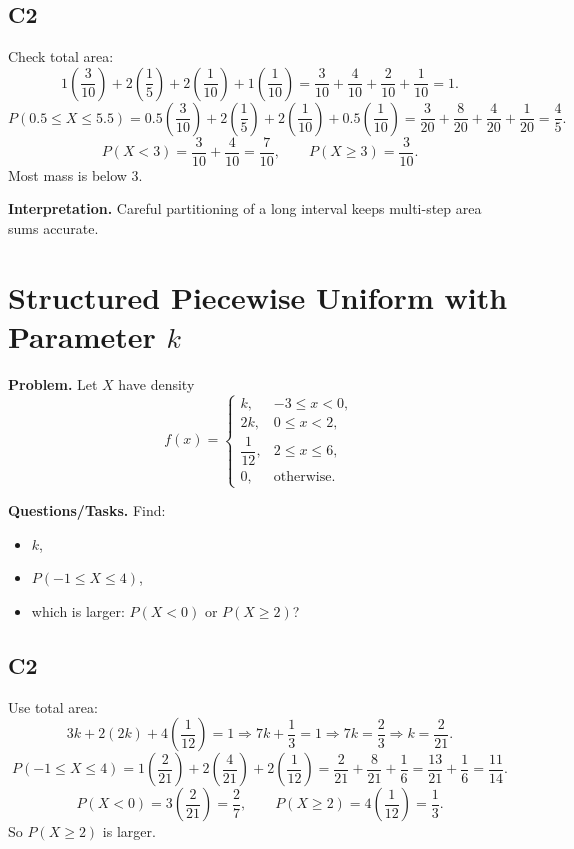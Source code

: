 \subsection*{C2}
Check total area:
\[
1\left(\frac{3}{10}\right)+2\left(\frac{1}{5}\right)+2\left(\frac{1}{10}\right)+1\left(\frac{1}{10}\right)
=\frac{3}{10}+\frac{4}{10}+\frac{2}{10}+\frac{1}{10}=1.
\]
\[
P(0.5\le X\le 5.5)=0.5\left(\frac{3}{10}\right)+2\left(\frac{1}{5}\right)+2\left(\frac{1}{10}\right)+0.5\left(\frac{1}{10}\right)
=\frac{3}{20}+\frac{8}{20}+\frac{4}{20}+\frac{1}{20}=\frac{4}{5}.
\]
\[
P(X<3)=\frac{3}{10}+\frac{4}{10}=\frac{7}{10},
\qquad
P(X\ge 3)=\frac{3}{10}.
\]
Most mass is below 3.

\textbf{Interpretation.}
Careful partitioning of a long interval keeps multi-step area sums accurate.

\section{Structured Piecewise Uniform with Parameter $k$}

\textbf{Problem.}
Let $X$ have density
\[
f(x)=
\begin{cases}
k, & -3\le x<0,\\
2k, & 0\le x<2,\\
\dfrac{1}{12}, & 2\le x\le 6,\\
0, & \text{otherwise.}
\end{cases}
\]

\textbf{Questions/Tasks.}
Find:
\begin{itemize}
    \item[(a)] $k$,
    \item[(b)] $P(-1\le X\le 4)$,
    \item[(c)] which is larger: $P(X<0)$ or $P(X\ge 2)$?
\end{itemize}

\subsection*{C2}
Use total area:
\[
3k+2(2k)+4\left(\frac{1}{12}\right)=1
\Rightarrow 7k+\frac{1}{3}=1
\Rightarrow 7k=\frac{2}{3}
\Rightarrow k=\frac{2}{21}.
\]
\[
P(-1\le X\le 4)=1\left(\frac{2}{21}\right)+2\left(\frac{4}{21}\right)+2\left(\frac{1}{12}\right)
=\frac{2}{21}+\frac{8}{21}+\frac{1}{6}
=\frac{13}{21}+\frac{1}{6}
=\frac{11}{14}.
\]
\[
P(X<0)=3\left(\frac{2}{21}\right)=\frac{2}{7},
\qquad
P(X\ge 2)=4\left(\frac{1}{12}\right)=\frac{1}{3}.
\]
So $P(X\ge 2)$ is larger.


